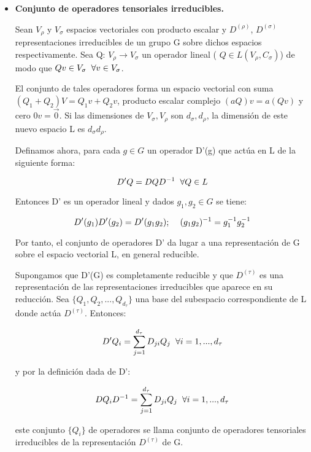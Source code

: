 \documentclass{article}
\begin{document}
       \begin{itemize}
           \item \textbf{Conjunto de operadores tensoriales irreducibles.}
           
           Sean $V_\rho$ y $V_\sigma$ espacios vectoriales con producto escalar y $D^{(\rho)}$, $D^{(\sigma)}$ representaciones irreducibles de un grupo G sobre dichos espacios respectivamente. Sea Q: $V_\rho \to V_\sigma$ un operador lineal ( $Q \in L(V_\rho ,C_\sigma)$) de modo que  $Qv\in V_\sigma \hspace{0.2cm} \forall v\in V_\sigma$.
           
           El conjunto de tales operadores forma un espacio vectorial con suma $(Q_1+Q_2)V=Q_1v+Q_2v$, producto escalar complejo $(aQ)v=a(Qv)$ y cero $0v=\Vec{0}$. Si las dimensiones de $V_\sigma, V_\rho$ son $d_\sigma, d_ \rho$, la dimensión de este nuevo espacio L es $d_ \sigma d_\rho$.
           
           Definamos ahora, para cada $g\in G$ un operador D'(g) que actúa en L de la siguiente forma:
           
           $$D'Q=DQD^{-1} \hspace{0.2cm}\forall Q\in L$$
           
           Entonces D' es un operador lineal y dados $g_1, g_2 \in G$ se tiene:
           
           $$D'(g_1)D'(g_2)=D'(g_1g_2); \hspace{0.4cm} (g_1g_2)^{-1}=g_1^{-1}g_2^{-1}$$
           
           Por tanto, el conjunto de operadores D' da lugar a una representación de G sobre el espacio vectorial L, en general reducible.
           
           Supongamos que D'(G) es completamente reducible y que $D^{(\tau)}$ es una representación de las representaciones irreducibles que aparece en su reducción. Sea $\lbrace Q_1,Q_2,...,Q_{d_\tau}\rbrace$ una base del subespacio correspondiente de L donde actúa $D^{(\tau)}$. Entonces:
           
           $$D'Q_i=\sum _{j=1}^{d_\tau} D_{ji}Q_j \hspace{0.2cm} \forall i=1,..., d_\tau$$
           
           y por la definición dada de D':
           
           $$DQ_iD^{-1}=\sum _{j=1}^{d_\tau} D_{ji}Q_j \hspace{0.2cm} \forall i=1,..., d_\tau$$
           
           este conjunto $\lbrace Q_i\rbrace$ de operadores se llama conjunto de operadores tensoriales irreducibles de la representación $D^{(\tau)}$ de G.
       \end{itemize}
       
\end{document}
